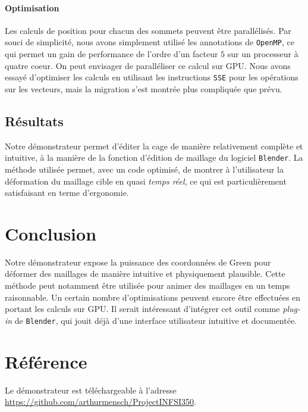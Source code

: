 \documentclass[10pt,a4paper]{article}
\begin{document}
\paragraph{Optimisation}Les calculs de position pour chacun des sommets peuvent être parallélisés. Par souci de simplicité, nous avons simplement utilisé les annotations de \texttt{OpenMP}, ce qui permet un gain de performance de l'ordre d'un facteur $5$ sur un processeur à quatre coeur. On peut envisager de paralléliser ce calcul sur GPU. Nous avons essayé d'optimiser les calculs en utilisant les instructions \texttt{SSE} pour les opérations sur les vecteurs, mais la migration s'est montrée plus compliquée que prévu.

\subsection{Résultats}

Notre démonstrateur permet d'éditer la cage de manière relativement complète et intuitive, à la manière de la fonction d'édition de maillage du logiciel \texttt{Blender}. La méthode utilisée permet, avec un code optimisé, de montrer à l'utilisateur la déformation du maillage cible en quasi \emph{temps réel}, ce qui est particulièrement satisfaisant en terme d'ergonomie.

\section*{Conclusion}

Notre démonstrateur expose la puissance des coordonnées de Green pour déformer des maillages de manière intuitive et physiquement plausible. Cette méthode peut notamment être utilisée pour animer des maillages en un temps raisonnable. Un certain nombre d'optimisations peuvent encore être effectuées en portant les calculs sur GPU. Il serait intéressant d'intégrer cet outil comme \textit{plug-in} de \texttt{Blender}, qui jouit déjà d'une interface utilisateur intuitive et documentée.

\section*{Référence}

Le démonstrateur est téléchargeable à l'adresse \url{https://github.com/arthurmensch/ProjectINFSI350}.




\end{document}
